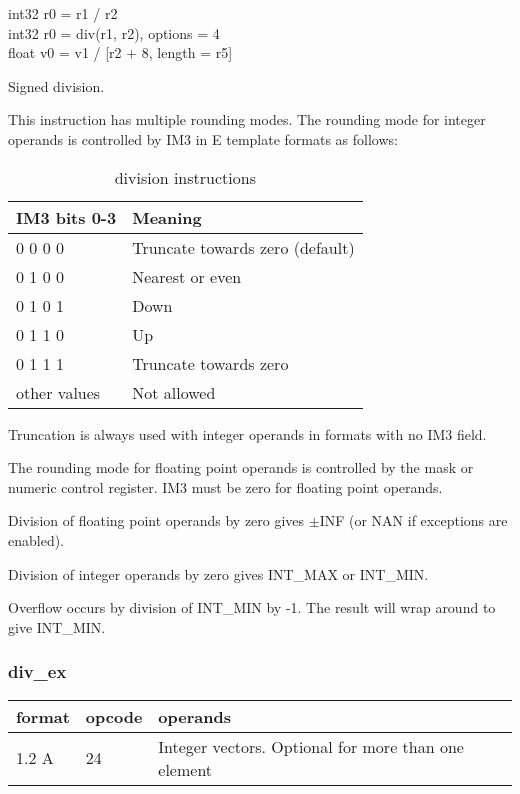 \documentclass[forwardcom.tex]{subfiles}
\begin{document}
int32 r0 = r1 / r2 \\
int32 r0 = div(r1, r2), options = 4\\
float v0 = v1 / [r2 + 8, length = r5]
\vspace{2mm}

Signed division.

\vspace{2mm}
This instruction has multiple rounding modes. The rounding mode for integer operands is controlled by IM3 in E template formats as follows:

\begin{longtable} {|p{25mm}|p{80mm}|}
\caption{division instructions} 
\label{table:DivInstructions} \\
\endfirsthead
\endhead
\hline
\bfseries IM3 bits 0-3 & \bfseries Meaning   \\
\hline
 0 0 0 0 & Truncate towards zero (default) \\
\hline
 0 1 0 0 & Nearest or even \\
 0 1 0 1 & Down \\
 0 1 1 0 & Up \\
 0 1 1 1 & Truncate towards zero \\
\hline
other values & Not allowed \\ 
\hline
\end{longtable}
Truncation is always used with integer operands in formats with no IM3 field.

\vspace{2mm}
The rounding mode for floating point operands is controlled by the mask or numeric control register. IM3 must be zero for floating point operands.

\vspace{2mm}
Division of floating point operands by zero gives $\pm$INF (or NAN if exceptions are enabled).

Division of integer operands by zero gives INT\_MAX or INT\_MIN.

Overflow occurs by division of INT\_MIN by -1. The result will wrap around to give INT\_MIN.

\subsubsection{div\_ex}
\label{table:divExInstruction}
\begin{tabular}{|p{12mm}|p{12mm}|p{110mm}|}
\hline
\bfseries format & \bfseries opcode & \bfseries operands \\ \hline
1.2 A & 24 & Integer vectors. Optional for more than one element \\ \hline
\end{tabular}
\vspace{2mm}
\end{document}
